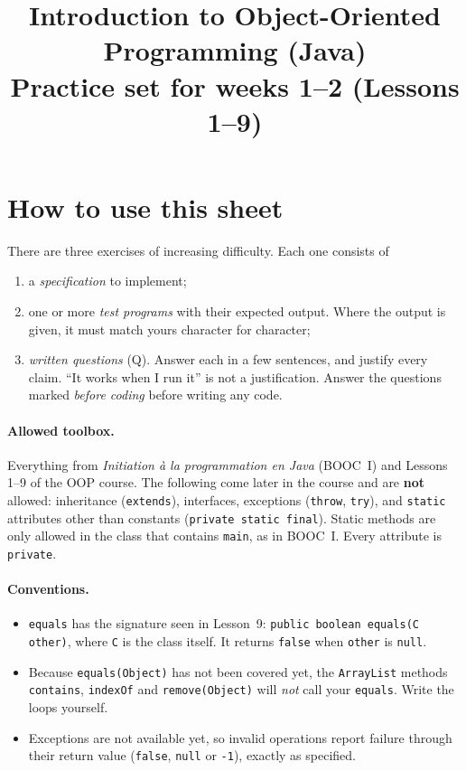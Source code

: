 \documentclass[11pt,a4paper]{article}
\title{Introduction to Object-Oriented Programming (Java)\\[0.3em]
\large Practice set for weeks 1--2 (Lessons 1--9)}
\author{}
\date{}
\newcommand{\code}[1]{\lstinline[basicstyle=\ttfamily\normalsize,basewidth=0.5em]{#1}}
\begin{document}
\maketitle
\vspace{-3em}

\section*{How to use this sheet}

There are three exercises of increasing difficulty. Each one consists of
\begin{enumerate}[label=(\alph*), itemsep=0pt]
  \item a \emph{specification} to implement;
  \item one or more \emph{test programs} with their expected output. Where the
        output is given, it must match yours character for character;
  \item \emph{written questions} (Q). Answer each in a few sentences, and
        justify every claim. ``It works when I run it'' is not a justification.
        Answer the questions marked \emph{before coding} before writing any code.
\end{enumerate}

\paragraph{Allowed toolbox.} Everything from \emph{Initiation à la
programmation en Java} (BOOC~I) and Lessons 1--9 of the OOP course. The
following come later in the course and are \textbf{not} allowed: inheritance
(\code{extends}), interfaces, exceptions (\code{throw}, \code{try}), and
\code{static} attributes other than constants (\code{private static final}).
Static methods are only allowed in the class that contains \code{main}, as
in BOOC~I. Every attribute is \code{private}.

\paragraph{Conventions.}
\begin{itemize}[itemsep=0pt]
  \item \code{equals} has the signature seen in Lesson~9:
        \code{public boolean equals(C other)}, where \code{C} is the class itself. It returns
        \code{false} when \code{other} is \code{null}.
  \item Because \code{equals(Object)} has not been covered yet, the \code{ArrayList}
        methods \code{contains}, \code{indexOf} and \code{remove(Object)} will
        \emph{not} call your \code{equals}. Write the loops yourself.
  \item Exceptions are not available yet, so invalid operations report failure
        through their return value (\code{false}, \code{null} or \code{-1}),
        exactly as specified.
\end{itemize}
\end{document}
